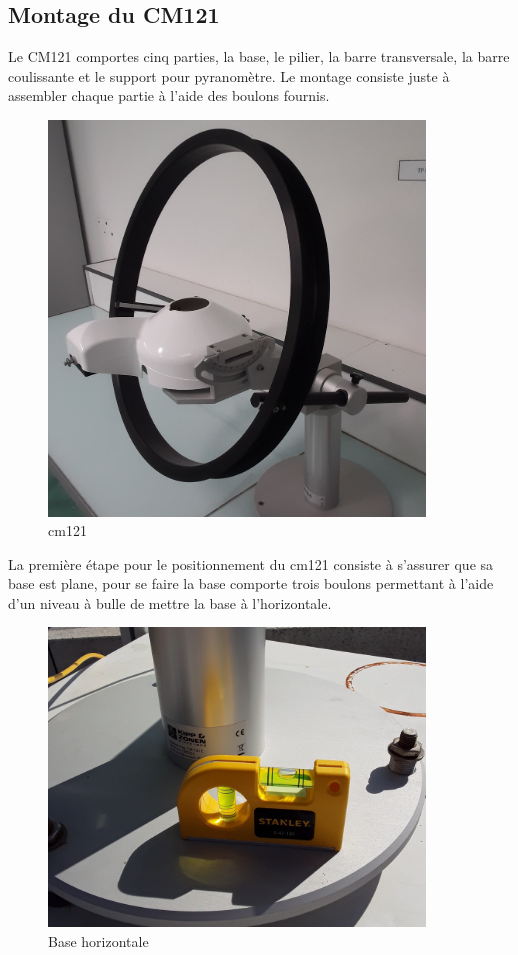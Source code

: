 \documentclass[12pt,a4paper]{article}
\begin{document}
\begin{flushleft}
\subsection{Montage du CM121}

Le CM121 comportes cinq parties, la base, le pilier, la barre transversale, la barre coulissante et le support pour pyranomètre. Le montage consiste juste à assembler chaque partie à l'aide des boulons fournis.

\begin{figure}[H]
\centering
\includegraphics[width=10cm]{image/montage/1.jpg} 
\caption{cm121}
\end{figure}


La première étape pour le positionnement du cm121 consiste à s'assurer que sa base est plane, pour se faire la base comporte trois boulons permettant à l'aide d'un niveau à bulle de mettre la base à l'horizontale. 

\begin{figure}[H]
\centering
\includegraphics[width=10cm]{image/montage/2.jpg} 
\caption{Base horizontale}
\end{figure}



\end{flushleft}
\end{document}
